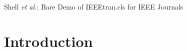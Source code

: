 \documentclass[journal]{IEEEtran}
\begin{document}
%
{Shell \MakeLowercase{\textit{et al.}}: Bare Demo of IEEEtran.cls for IEEE Journals}
% 











\maketitle









%
\IEEEpeerreviewmaketitle



\section{Introduction}
% 
% 
% 
% 
\end{document}
